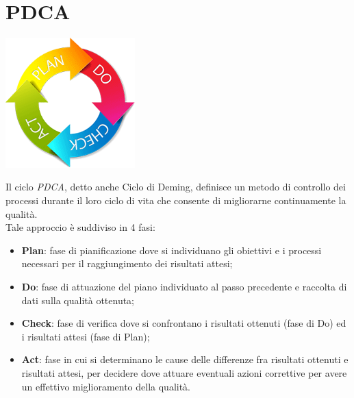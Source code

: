 \newpage
\section{PDCA}

\begin{center}
\includegraphics[keepaspectratio = true, width=5cm]{PDCA.png}
\end{center}

Il ciclo \textit{PDCA}, detto anche Ciclo di Deming, definisce un metodo di controllo dei processi durante il loro ciclo di vita che consente di migliorarne continuamente la qualità. \\ Tale approccio è suddiviso in 4 fasi:
\begin{itemize}
\item \textbf{Plan}: fase di pianificazione dove si individuano gli obiettivi e i processi necessari per il raggiungimento dei risultati attesi;
\item \textbf{Do}: fase di attuazione del piano individuato al passo precedente e raccolta di dati sulla qualità ottenuta;
\item \textbf{Check}: fase di verifica dove si confrontano i risultati ottenuti (fase di Do) ed i risultati attesi (fase di Plan);
\item \textbf{Act}: fase in cui si determinano le cause delle differenze fra risultati ottenuti e risultati attesi, per decidere dove attuare eventuali azioni correttive per avere un effettivo miglioramento della qualità.
\end{itemize}